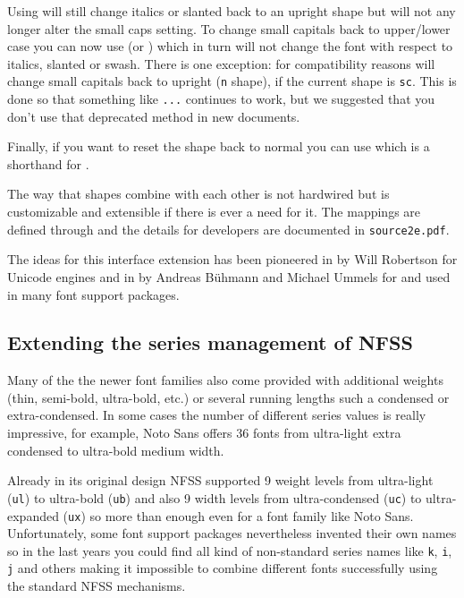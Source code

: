 \documentclass{ltnews}
\providecommand\pdfTeX{\hologo{pdfTeX}}
\begin{document}
Using  will still change italics or slanted back to an
upright shape but will not any longer alter the small caps setting. To
change small capitals back to upper/lower case you can now use
 (or ) which in turn will not change the font
with respect to italics, slanted or swash.
%
There is one exception: for compatibility reasons  will
change small capitals back to upright (\texttt{n} shape), if the
current shape is \texttt{sc}. This is done so that something like
\allowbreak\texttt{...}\allowbreak{} continues
to work, but we suggested that you don't use that deprecated method in
new documents.

Finally, if you want to
reset the shape back to normal you can use  which is a
shorthand for .

The way that shapes combine with each other is not hardwired but is
customizable and extensible if there is ever a need for it. The
mappings are defined through  and the
details for developers are documented in \texttt{source2e.pdf}.

The ideas for this interface extension has been pioneered in
 by Will Robertson for Unicode engines and in
 by Andreas Bühmann and Michael Ummels for \pdfTeX{} and
used in many font support packages.



\subsection{Extending the series management of NFSS}

Many of the the newer font families also come provided with additional
weights (thin, semi-bold, ultra-bold, etc.\@) or several running lengths
such a condensed or extra-condensed. In some cases the number of
different series values is really impressive, for example, Noto Sans
offers 36 fonts from ultra-light extra condensed to ultra-bold medium width.

Already in its original design NFSS supported 9 weight levels from
ultra-light (\texttt{ul}) to ultra-bold (\texttt{ub}) and also 9 width
levels from ultra-condensed (\texttt{uc}) to ultra-expanded
(\texttt{ux}) so more than enough even for a font family like Noto
Sans. Unfortunately, some font support packages nevertheless invented
their own names so in the last years you could find all kind of
non-standard series names like \texttt{k}, \texttt{i}, \texttt{j} and
others making it impossible to combine different fonts successfully
using the standard NFSS mechanisms.
\end{document}
